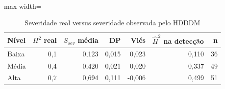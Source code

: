\begin{table}[htbp]
\centering
\small
\caption{Severidade real versus severidade observada pelo HDDDM}
\label{tab:severidade-obs}
\begin{adjustbox}{max width=\textwidth}
\begin{tabular}{lrrrrrr}
\toprule
Nível & $H^2$ real & $S_{sev}$ média & DP & Viés & $\hat H^2$ na detecção & n \\
\midrule
Baixa & 0,1 & 0,123 & 0,015 & 0,023 & 0,110 & 36 \\
Média & 0,4 & 0,420 & 0,021 & 0,020 & 0,337 & 49 \\
Alta & 0,7 & 0,694 & 0,111 & -0,006 & 0,499 & 51 \\
\bottomrule
\end{tabular}
\end{adjustbox}
\par\vspace{2pt}{\footnotesize Spearman $\rho$ = 0,897; erro absoluto médio = 0,031.}
\end{table}
